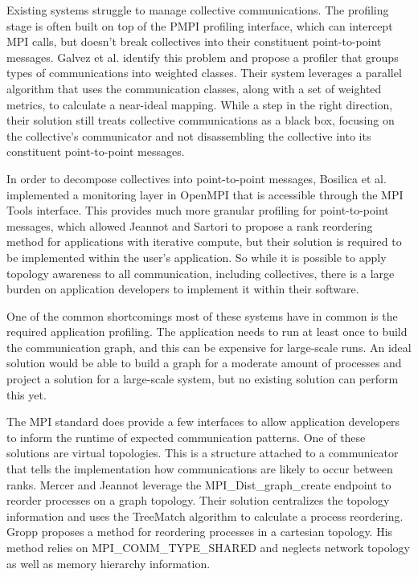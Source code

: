 Existing systems struggle to manage collective communications.
The profiling stage is often built on top of the PMPI profiling interface, which can intercept MPI calls, but doesn't break collectives into their constituent point-to-point messages.
Galvez et al. \cite{Galvez2017AutoTopoMap} identify this problem and propose a profiler that groups types of communications into weighted classes.
Their system leverages a parallel algorithm that uses the communication classes, along with a set of weighted metrics, to calculate a near-ideal mapping.
While a step in the right direction, their solution still treats collective communications as a black box, focusing on the collective's communicator and not disassembling the collective into its constituent point-to-point messages.

In order to decompose collectives into point-to-point messages, Bosilica et al. \cite{Bosilica2017OnlineMonitoringMPI} implemented a monitoring layer in OpenMPI that is accessible through the MPI Tools interface.
This provides much more granular profiling for point-to-point messages, which allowed Jeannot and Sartori \cite{Jeannot2020ImprvMPICommMonitoring} to propose a rank reordering method for applications with iterative compute, but their solution is required to be implemented within the user's application. 
So while it is possible to apply topology awareness to all communication, including collectives, there is a large burden on application developers to implement it within their software.

One of the common shortcomings most of these systems have in common is the required application profiling.
The application needs to run at least once to build the communication graph, and this can be expensive for large-scale runs. 
An ideal solution would be able to build a graph for a moderate amount of processes and project a solution for a large-scale system, but no existing solution can perform this yet. 

The MPI standard does provide a few interfaces to allow application developers to inform the runtime of expected communication patterns.  
One of these solutions are virtual topologies. 
This is a structure attached to a communicator that tells the implementation how communications are likely to occur between ranks.
Mercer and Jeannot \cite{Mercer2011ImprvMPIWithRR} leverage the MPI\_Dist\_graph\_create endpoint to reorder processes on a graph topology.
Their solution centralizes the topology information and uses the TreeMatch algorithm \cite{Jeannot2010TreeMatch} to calculate a process reordering.
Gropp \cite{Gropp2019CartTopoMapping} proposes a method for reordering processes in a cartesian topology.
His method relies on MPI\_COMM\_TYPE\_SHARED and neglects network topology as well as memory hierarchy information.

